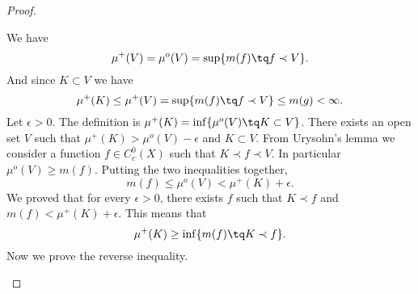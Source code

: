 \begin{proof}
\begin{subproof}
		We have
		\begin{equation}
			\mu^+(V)=\mu^o(V)=\sup\{ m(f)\tq f\prec V \}.
		\end{equation}
		And since \( K\subset V\) we have
		\begin{equation}
			\mu^+(K)\leq \mu^+(V)=\sup\{ m(f)\tq f\prec V \}\leq m(g)<\infty.
		\end{equation}
		\spitem[\( \mu^+(K)=\inf\{ m(f):\, K\prec f \}\)]
		Let \( \epsilon>0\). The definition is \( \mu^+(K)=\inf\{ \mu^o(V)\tq K\subset V \}\). There exists an open set \( V\) such that \( \mu^+(K)>\mu^o(V)-\epsilon\) and \( K\subset V\). From Urysohn's lemma we consider a function \( f\in C^0_c(X)\) such that \( K\prec f\prec V\). In particular \( \mu^o(V)\geq m(f)\). Putting the two inequalities together,
		\begin{equation}
			m(f)\leq \mu^o(V)<\mu^+(K)+\epsilon.
		\end{equation}
		We proved that for every \( \epsilon>0\), there exists \( f\) such that \( K\prec f\) and \( m(f)<\mu^+(K)+\epsilon\). This means that
		\begin{equation}
			\mu^+(K)\geq\inf\{ m(f)\tq K\prec f \}.
		\end{equation}
		Now we prove the reverse inequality.


\end{subproof}
\end{proof}
